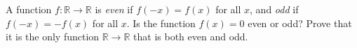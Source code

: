 A function $f:\mathbb R\to\mathbb R$ is \emph{even} if $f(-x)=f(x)$ for all $x$, and \emph{odd} if $f(-x)=-f(x)$ for all $x$. Is the function $f(x)=0$ even or odd? Prove that it is the only function $\mathbb R\to\mathbb R$ that is both even and odd.
